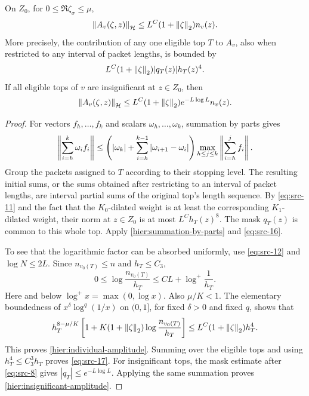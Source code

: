 \begin{lemma}
\label{hier:amplitudes}
On $Z_0$, for $0\le\Re\zeta_\sigma\le\mu$,
\begin{equation}
 \left\|A_v(\zeta,z)\right\|_{\mathcal H}
 \le L^C(1+\left\|\zeta\right\|_2)n_v(z).
 \label{eq:src-17}
\end{equation}
More precisely, the contribution of any one eligible top $T$ to $A_v$,
also when restricted to any interval of packet lengths, is bounded by
\begin{equation}
 L^C(1+\left\|\zeta\right\|_2)|q_T(z)|h_T(z)^4.
 \label{hier:individual-amplitude}
\end{equation}
If all eligible tops of $v$ are insignificant at $z\in Z_0$, then
\begin{equation}
 \left\|A_v(\zeta,z)\right\|_{\mathcal H}
 \le L^C(1+\left\|\zeta\right\|_2)e^{-L\log L}n_v(z).
 \label{hier:insignificant-amplitude}
\end{equation}
\end{lemma}

\begin{proof}
For vectors $f_h,\ldots,f_k$ and scalars $\omega_h,\ldots,\omega_k$,
summation by parts gives
\begin{equation}
 \left\|\sum_{i=h}^k\omega_i f_i\right\|
 \le
 \left(|\omega_k|+\sum_{i=h}^{k-1}|\omega_{i+1}-\omega_i|\right)
 \max_{h\le j\le k}\left\|\sum_{i=h}^j f_i\right\|.
 \label{hier:summation-by-parts}
\end{equation}
Group the packets assigned to $T$ according to their stopping level.
The resulting initial sums, or the sums obtained after restricting to an
interval of packet lengths, are interval partial sums of the original
top's length sequence.  By \eqref{eq:src-11} and the fact that the
$K_0$-dilated weight is at least the corresponding $K_1$-dilated weight,
their norm at $z\in Z_0$ is at most $L^C h_T(z)^8$.  The mask $q_T(z)$
is common to this whole top.  Apply
\eqref{hier:summation-by-parts} and \eqref{eq:src-16}.

To see that the logarithmic factor can be absorbed uniformly, use
\eqref{eq:src-12} and $\log N\le2L$.  Since $n_{v_0(T)}\le n$ and
$h_T\le C_3$,
\[
 0\le\log\frac{n_{v_0(T)}}{h_T}
 \le C L+\log^+\frac1{h_T}.
\]
Here and below $\log^+x=\max(0,\log x)$.  Also $\mu/K<1$.  The
elementary boundedness of $x^\delta\log^q(1/x)$ on $(0,1]$, for fixed
$\delta>0$ and fixed $q$, shows that
\[
 h_T^{8-\mu/K}
 \left[1+K(1+\left\|\zeta\right\|_2)
                    \log\frac{n_{v_0(T)}}{h_T}\right]
 \le L^C(1+\left\|\zeta\right\|_2)h_T^4.
\]
This proves \eqref{hier:individual-amplitude}.  Summing over the eligible
tops and using $h_T^4\le C_3^3h_T$ proves \eqref{eq:src-17}.
For insignificant tops, the mask estimate after \eqref{eq:src-8} gives
$|q_T|\le e^{-L\log L}$.  Applying the same summation proves
\eqref{hier:insignificant-amplitude}.
\end{proof}

